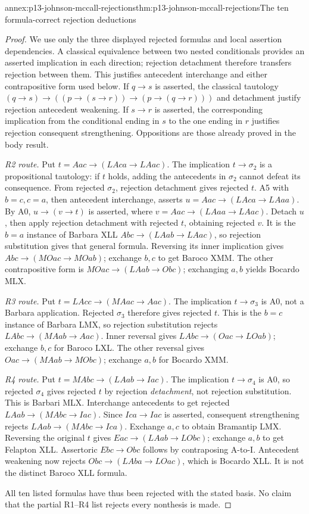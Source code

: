 \begin{annexitem}{annex:p13-johnson-mccall-rejections}{thm:p13-johnson-mccall-rejections}{The ten formula-correct rejection deductions}
\begin{proof}
We use only the three displayed rejected formulas and local assertion
dependencies. A classical equivalence between two nested conditionals
provides an asserted implication in each direction; rejection detachment
therefore transfers rejection between them. This justifies antecedent
interchange and either contrapositive form used below. If \(q\to s\)
is asserted, the classical tautology
\((q\to s)\to((p\to(s\to r))\to(p\to(q\to r)))\)
and detachment justify rejection antecedent weakening. If \(s\to r\)
is asserted, the corresponding implication from the conditional ending
in \(s\) to the one ending in \(r\) justifies rejection consequent
strengthening. Oppositions are those already proved in the body result.

\emph{R2 route.} Put \(t=Aac\to(LAca\to LAac)\).
The implication \(t\to\sigma_2\) is a propositional tautology: if \(t\)
holds, adding the antecedents in \(\sigma_2\) cannot defeat its consequence.
From rejected \(\sigma_2\), rejection detachment gives rejected \(t\).
A5 with \(b=c,c=a\), then antecedent interchange, asserts
\(u=Aac\to(LAca\to LAaa)\). By A0,
\(u\to(v\to t)\) is asserted, where
\(v=Aac\to(LAaa\to LAac)\). Detach \(u\), then apply rejection
detachment with rejected \(t\), obtaining rejected \(v\).
It is the \(b=a\) instance of Barbara XLL
\(Abc\to(LAab\to LAac)\), so rejection substitution gives that general
formula. Reversing its inner implication gives
\(Abc\to(MOac\to MOab)\); exchange \(b,c\) to get Baroco XMM.
The other contrapositive form is
\(MOac\to(LAab\to Obc)\); exchanging \(a,b\) yields Bocardo MLX.

\emph{R3 route.} Put \(t=LAcc\to(MAac\to Aac)\).
The implication \(t\to\sigma_3\) is A0, not a Barbara application.
Rejected \(\sigma_3\) therefore gives rejected \(t\). This is the
\(b=c\) instance of Barbara LMX, so rejection substitution rejects
\(LAbc\to(MAab\to Aac)\). Inner reversal gives
\(LAbc\to(Oac\to LOab)\); exchange \(b,c\) for Baroco LXL.
The other reversal gives \(Oac\to(MAab\to MObc)\); exchange \(a,b\)
for Bocardo XMM.

\emph{R4 route.} Put \(t=MAbc\to(LAab\to Iac)\).
The implication \(t\to\sigma_4\) is A0, so rejected \(\sigma_4\)
gives rejected \(t\) by rejection \emph{detachment}, not rejection
substitution. This is Barbari MLX. Interchange antecedents to get rejected
\(LAab\to(MAbc\to Iac)\). Since \(Ica\to Iac\) is asserted,
consequent strengthening rejects \(LAab\to(MAbc\to Ica)\).
Exchange \(a,c\) to obtain Bramantip LMX.
Reversing the original \(t\) gives
\(Eac\to(LAab\to LObc)\); exchange \(a,b\) to get Felapton XLL.
Assertoric \(Ebc\to Obc\) follows by contraposing A-to-I.
Antecedent weakening now rejects \(Obc\to(LAba\to LOac)\),
which is Bocardo XLL. It is not the distinct Baroco XLL formula.

All ten listed formulas have thus been rejected with the stated basis.
No claim that the partial R1--R4 list rejects every nonthesis is made.
\end{proof}
\end{annexitem}

